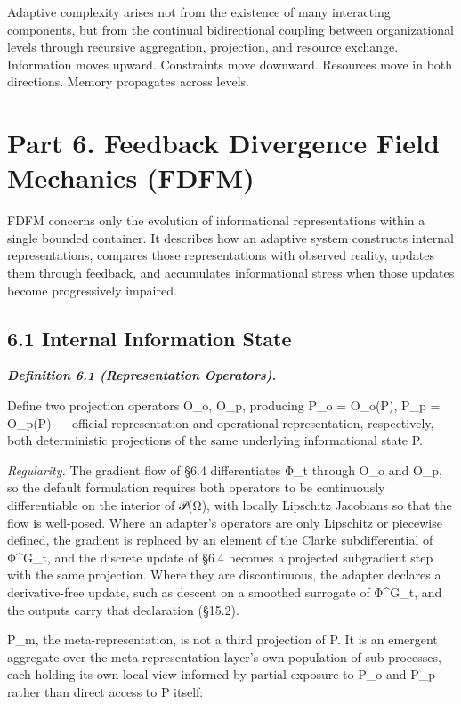 \documentclass[
]{article}
\begin{document}
Adaptive complexity arises not from the existence of many interacting
components, but from the continual bidirectional coupling between
organizational levels through recursive aggregation, projection, and
resource exchange. Information moves upward. Constraints move downward.
Resources move in both directions. Memory propagates across levels.

\hypertarget{part-6.-feedback-divergence-field-mechanics-fdfm}{%
\section{Part 6. Feedback Divergence Field Mechanics
(FDFM)}\label{part-6.-feedback-divergence-field-mechanics-fdfm}}

FDFM concerns only the evolution of informational representations within
a single bounded container. It describes how an adaptive system
constructs internal representations, compares those representations with
observed reality, updates them through feedback, and accumulates
informational stress when those updates become progressively impaired.

\hypertarget{internal-information-state}{%
\subsection{6.1 Internal Information
State}\label{internal-information-state}}

\emph{\textbf{Definition 6.1 (Representation Operators).}}

Define two projection operators O\_o, O\_p, producing P\_o = O\_o(P),
P\_p = O\_p(P) --- official representation and operational
representation, respectively, both deterministic projections of the same
underlying informational state P.

\emph{Regularity.} The gradient flow of §6.4 differentiates Φ\_t through
O\_o and O\_p, so the default formulation requires both operators to be
continuously differentiable on the interior of 𝒫(Ω), with locally
Lipschitz Jacobians so that the flow is well-posed. Where an adapter's
operators are only Lipschitz or piecewise defined, the gradient is
replaced by an element of the Clarke subdifferential of Φ\^{}G\_t, and
the discrete update of §6.4 becomes a projected subgradient step with
the same projection. Where they are discontinuous, the adapter declares
a derivative-free update, such as descent on a smoothed surrogate of
Φ\^{}G\_t, and the outputs carry that declaration (§15.2).

P\_m, the meta-representation, is not a third projection of P. It is an
emergent aggregate over the meta-representation layer's own population
of sub-processes, each holding its own local view informed by partial
exposure to P\_o and P\_p rather than direct access to P itself:
\end{document}
